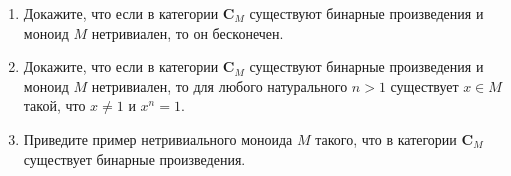 \documentclass[draft]{article}
\newcommand{\cat}[1]{\mathbf{#1}}
\renewcommand{\C}{\cat{C}}
\begin{document}
\begin{enumerate}

\item Докажите, что если в категории $\C_M$ существуют бинарные произведения и моноид $M$ нетривиален, то он бесконечен.

%
%
%
%
%

\item Докажите, что если в категории $\C_M$ существуют бинарные произведения и моноид $M$ нетривиален, то для любого натурального $n > 1$ существует $x \in M$ такой, что $x \neq 1$ и $x^n = 1$.

\item Приведите пример нетривиального моноида $M$ такого, что в категории $\C_M$ существует бинарные произведения.

\end{enumerate}
\end{document}
